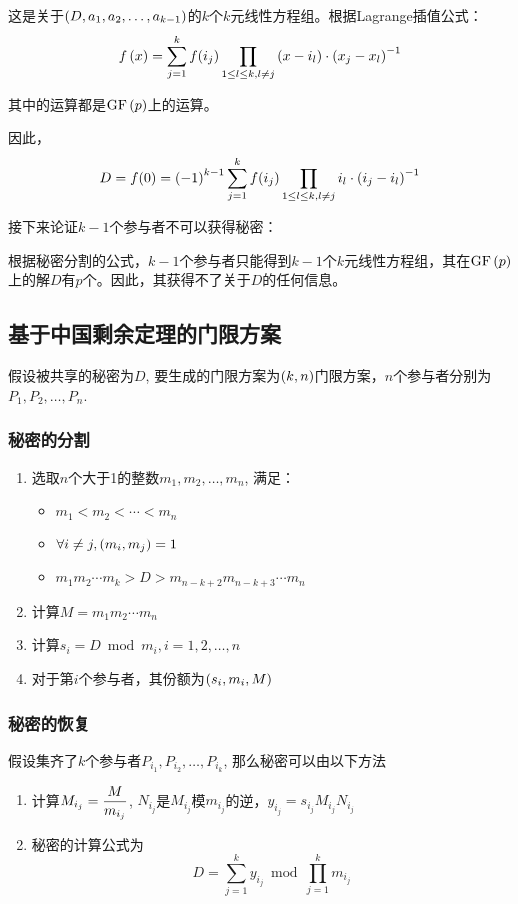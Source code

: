 这是关于$\left( {D, a_1, a_2,\ldots, a_{k-1}}\right)$的$k$个$k$元线性方程组。根据Lagrange插值公式：
\begin{equation}
f\left( {x}\right)=\sum_{j=1}^kf(i_j)\prod_{1\leq l\leq k, l\neq j}\left( {x-i_l}\right)\cdot\left( {x_j-x_l}\right)^{-1}
\end{equation}

其中的运算都是$\mathrm{GF}\left( {p}\right)$上的运算。\par
因此，
\begin{equation}
D=f(0)=\left( {-1}\right)^{k-1}\sum_{j=1}^kf(i_j)\prod_{1\leq l\leq k, l\neq j}i_l\cdot\left( {i_j-i_l}\right)^{-1}
\end{equation}

接下来论证$k-1$个参与者不可以获得秘密：\par
根据秘密分割的公式，$k-1$个参与者只能得到$k-1$个$k$元线性方程组，其在$\mathrm{GF}\left( {p}\right)$上的解$D$有$p$个。因此，其获得不了关于$D$的任何信息。
\subsection{基于中国剩余定理的门限方案}
假设被共享的秘密为$D$, 要生成的门限方案为$\left( {k, n}\right)$门限方案，$n$个参与者分别为$P_1, P_2,\ldots, P_n$.
\subsubsection{秘密的分割}
\begin{enumerate}
	\item 选取$n$个大于1的整数$m_1, m_2, \ldots, m_n$, 满足：
	\begin{itemize}
		\item $m_1<m_2<\cdots <m_n$
		\item $\forall i\neq j, \left( {m_i, m_j}\right)=1$
		\item $m_1m_2\cdots m_k>D>m_{n-k+2}m_{n-k+3}\cdots m_n$
	\end{itemize}
	\item 计算$M=m_1m_2\cdots m_n$
	\item 计算$s_i=D\bmod{m_i}, i=1, 2,\ldots, n$
	\item 对于第$i$个参与者，其份额为$\left( {s_i, m_i, M}\right)$
\end{enumerate}
\subsubsection{秘密的恢复}
假设集齐了$k$个参与者$P_{i_1}, P_{i_2}, \ldots, P_{i_k}$, 那么秘密可以由以下方法
\begin{enumerate}
	\item 计算$\displaystyle M_{i_j}=\frac{M}{m_{i_j}}$, $N_{i_j}$是$M_{i_j}$模$m_{i_j}$的逆，$y_{i_j}=s_{i_j}M_{i_j}N_{i_j}$
	\item 秘密的计算公式为
	\begin{equation}
	D=\sum_{j=1}^ky_{i_j}\bmod{\prod_{j=1}^km_{i_j}}
	\end{equation}
\end{enumerate}
